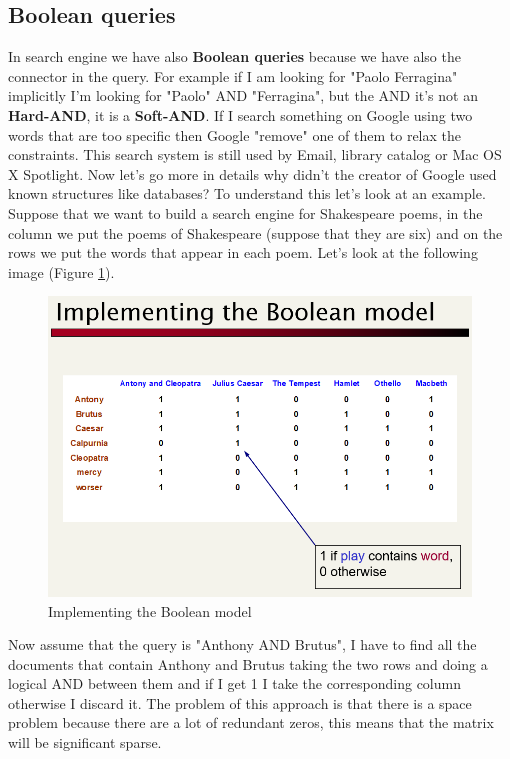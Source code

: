 \subsection{Boolean queries}
In search engine we have also \textbf{Boolean queries} because we have also the connector in the query. For example if I am looking for "Paolo Ferragina" implicitly I'm looking for "Paolo" AND "Ferragina", but the AND it's not an \textbf{Hard-AND}, it is a \textbf{Soft-AND}.\newline
If I search something on Google using two words that are too specific then Google "remove" one of them to relax the constraints.\newline
This search system is still used by Email, library catalog or Mac OS X Spotlight.\newline
Now let's go more in details why didn't the creator of Google used known structures like databases? To understand this let's look at an example.
Suppose that we want to build a search engine for Shakespeare poems, in the column we put the poems of Shakespeare (suppose that they are six) and on the rows we put the words that appear in each poem.\newline
Let's look at the following image (Figure \ref{fig:booleanmodel}).
\begin{figure}
    \centering
    \includegraphics[width=0.8\linewidth]{images/boolean model.png}
    \caption{Implementing the Boolean model}
    \label{fig:booleanmodel}
\end{figure}
Now assume that the query is "Anthony AND Brutus", I have to find all the documents that contain Anthony and Brutus taking the two rows and doing a logical AND between them and if I get 1 I take the corresponding column otherwise I discard it.\newline
The problem of this approach is that there is a space problem because there are a lot of redundant zeros, this means that the matrix will be significant sparse. 
